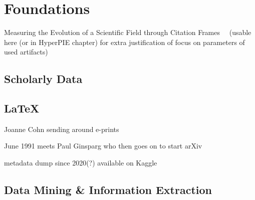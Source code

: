 \chapter{Foundations}

Measuring the Evolution of a Scientific Field through Citation Frames~~\cite{Jurgens2018} (usable here (or in HyperPIE chapter) for extra justification of focus on parameters of used artifacts)

\section{Scholarly Data}

\section{\LaTeX}

Joanne Cohn sending around e-prints~\cite{Turner2012}

June 1991 meets Paul Ginsparg who then goes on to start arXiv~\cite{Ginsparg2011a,Ginsparg2011}

metadata dump since 2020(?) available on Kaggle~\cite{arxiv_kaggle_dataset}

\section{Data Mining \& Information Extraction}
